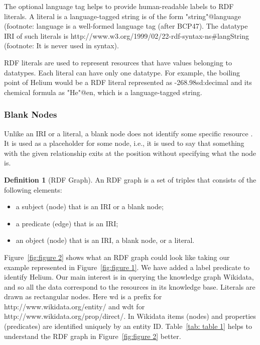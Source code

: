 \documentclass[12 pt, a4paper]{report}
\theoremstyle{definition}
\newtheorem{definition}{Definition}[section]
\begin{document}
The optional language tag helps to provide human-readable labels to RDF literals. A literal is a language-tagged string is of the form "string"@language (footnote: language is a well-formed language tag (after BCP47). The datatype IRI of such literals is http://www.w3.org/1999/02/22-rdf-syntax-ns\#langString (footnote: It is never used in syntax).


RDF literals are used to represent resources that have values belonging to datatypes. Each literal can have only one datatype. For example, the boiling point of Helium would be a RDF literal represented as -268.9^^xsd:decimal and its chemical formula as "He"@en, which is a language-tagged string. 

\subsubsection{Blank Nodes}
Unlike an IRI or a literal, a blank node does not identify some specific resource \cite{ R.Cyganiak2014}. It is used as a placeholder for some node, i.e., it is used to say that something with the given relationship exits at the position without specifying what the node is.

\begin{definition}[RDF Graph]
An RDF graph is a set of triples that consists of the following elements: 

\begin{itemize}
	\item a subject (node) that is an IRI or a blank node; 
	\item a predicate (edge) that is an IRI; 
	\item an object (node) that is an IRI, a blank node, or a literal. 
\end{itemize}	
\end{definition}

Figure~\ref{fig:figure 2} shows what an RDF graph could look like taking our example represented in Figure~\ref{fig:figure 1}. We have added a label predicate to identify Helium. Our main interest is in querying the knowledge graph Wikidata, and so all the data correspond to the resources in its knowledge base. Literals are drawn as rectangular nodes. Here wd is a prefix for http://www.wikidata.org/entity/ and wdt for http://www.wikidata.org/prop/direct/. In Wikidata items (nodes) and properties (predicates) are identified uniquely by an entity ID. Table~\ref{tab: table 1} helps to understand the RDF graph in Figure~\ref{fig:figure 2} better.
\end{document}

